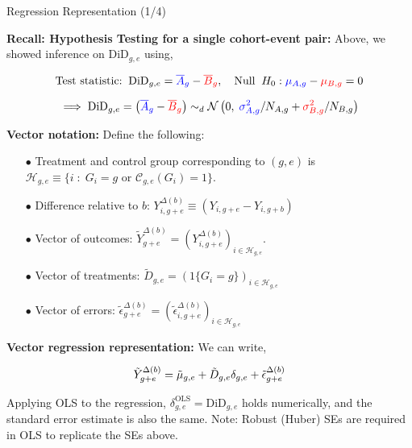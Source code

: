 \documentclass[usenames,dvipsnames]{beamer}
\begin{document}
\begin{frame}{Regression Representation (1/4)}

\textbf{Recall: Hypothesis Testing for a single cohort-event pair:}  Above, we showed inference on $\text{DiD}_{g,e}$ using,

\vspace{-0.7cm}

\begin{equation} \notag
\text{Test statistic:} \;\; \text{DiD}_{g,e} = {\color{blue}\overline{A}_g} - {\color{red}\overline{B}_g} , \quad \text{Null} \;\; H_0:   {\color{blue}\mu_{A,g}} - {\color{red}\mu_{B,g}} = 0
\end{equation}

\vspace{-0.8cm}

\begin{equation} \notag
\implies  \text{DiD}_{g,e} = \left(  {\color{blue}\overline{A}_g} - {\color{red}\overline{B}_g} \right) \sim_d  \mathcal{N}\left( 0 , \;  {\color{blue}\sigma^2_{A,g}}/N_{A,g}  + {\color{red}\sigma^2_{B,g}}/N_{B,g}   \right)
\end{equation}

\vspace{-0.1cm}

\textbf{Vector notation:} Define the following: 
\vspace{-0.1cm}
\begin{itemize}
\item[$\bullet$] Treatment and control group corresponding to $(g,e)$ is  $\mathcal{H}_{g,e} \equiv \{i\; :\; G_i = g \text{ or } \mathcal{C}_{g,e}(G_i)=1 \}$.
\item[$\bullet$] Difference relative to $b$: $Y^{\Delta(b)}_{i,g+e} \equiv (Y_{i,g+e} - Y_{i,g+b})$
\item[$\bullet$] Vector of outcomes: $\tilde{Y}^{\Delta(b)}_{g+e} = ( Y^{\Delta(b)}_{i,g+e} )_{i \in \mathcal{H}_{g,e}}$. 
\item[$\bullet$] Vector of treatments: $\tilde{D}_{g,e} = ( 1\{ G_i = g \} )_{i \in \mathcal{H}_{g,e}}$
\item[$\bullet$] Vector of errors: $\tilde{\epsilon}^{\Delta(b)}_{g+e} = ( \tilde{\epsilon}^{\Delta(b)}_{i,g+e} )_{i \in \mathcal{H}_{g,e}}$
\end{itemize}

 

\textbf{Vector regression representation:} We can write,  

\vspace{-0.4cm}

\begin{equation} \notag
\tilde{Y}^{\Delta(b)}_{g+e} 
= 
\tilde{\mu}_{g,e} + 
\tilde{D}_{g,e} \delta_{g,e} + 
\tilde{\epsilon}^{\Delta(b)}_{g+e}
\end{equation}

\vspace{-0.3cm}
 
Applying OLS to the regression, $\delta^{\text{OLS}}_{g,e} = \text{DiD}_{g,e}$ holds numerically, and the standard error estimate is also the same. Note:  Robust (Huber) SEs are required in OLS to replicate the SEs above.
 

\end{frame}
\end{document}

